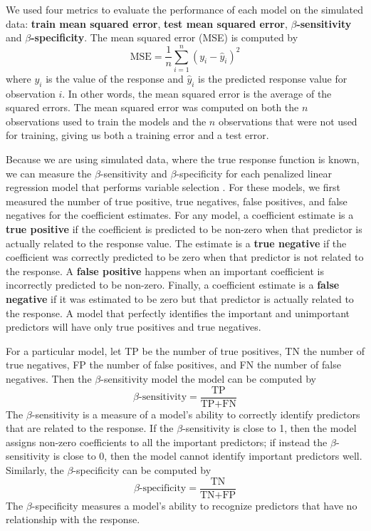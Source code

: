 \documentclass{article}
\begin{document}
	We used four metrics to evaluate the performance of each model on the simulated data: \textbf{train mean squared error}, \textbf{test mean squared error}, \textbf{$\beta$-sensitivity} and \textbf{$\beta$-specificity}. The mean squared error (MSE) is computed by
	\begin{equation}
		\text{MSE} = \frac{1}{n}\sum\limits_{i = 1}^n (y_i - \hat{y}_i)^2
	\end{equation}
	where $y_i$ is the value of the response and $\hat{y}_i$ is the predicted response value for observation $i$. In other words, the mean squared error is the average of the squared errors. The mean squared error was computed on both the $n$ observations used to train the models and the $n$ observations that were not used for training, giving us both a training error and a test error.
	
	Because we are using simulated data, where the true response function is known, we can measure the $\beta$-sensitivity and $\beta$-specificity for each penalized linear regression model that performs variable selection \cite{liu2020logsum}. For these models, we first measured the number of true positive, true negatives, false positives, and false negatives for the coefficient estimates. For any model, a coefficient estimate is a \textbf{true positive} if the coefficient is predicted to be non-zero when that predictor is actually related to the response value. The estimate is a \textbf{true negative} if the coefficient was correctly predicted to be zero when that predictor is not related to the response. A \textbf{false positive} happens when an important coefficient is incorrectly predicted to be non-zero. Finally, a coefficient estimate is a \textbf{false negative} if it was estimated to be zero but that predictor is actually related to the response. A model that perfectly identifies the important and unimportant predictors will have only true positives and true negatives.
	
	For a particular model, let TP be the number of true positives, TN the number of true negatives, FP the number of false positives, and FN the number of false negatives. Then the $\beta$-sensitivity model the model can be computed by
	\begin{equation}
		\beta\text{-sensitivity} = \frac{\text{TP}}{\text{TP} + \text{FN}}
	\end{equation}
	The $\beta$-sensitivity is a measure of a model's ability to correctly identify predictors that are related to the response. If the $\beta$-sensitivity is close to 1, then the model assigns non-zero coefficients to all the important predictors; if instead the $\beta$-sensitivity is close to 0, then the model cannot identify important predictors well. Similarly, the $\beta$-specificity can be computed by
	\begin{equation}
		\beta\text{-specificity} = \frac{\text{TN}}{\text{TN} + \text{FP}}
	\end{equation}
	The $\beta$-specificity measures a model's ability to recognize predictors that have no relationship with the response.
	
\end{document}
